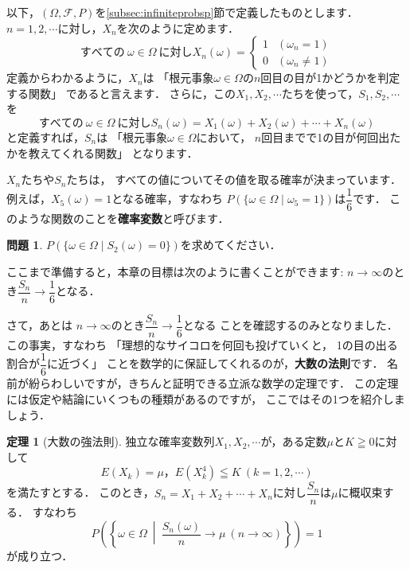 \documentclass[./main]{subfiles} %
\theoremstyle{definition}
\newtheorem{hamadaqst}[hamadadefi]{問題}
\newtheorem{hamadathm}[hamadadefi]{定理}
\begin{document}
\label{randomvariable}

以下，$(\Omega,\mathcal{F},P)$を\ref{subsec:infiniteprobsp}節で定義したものとします．
$n=1,2,\cdots$に対し，$X_n$を次のように定めます．
\[ すべての\ \omega\in\Omega\ に対しX_n(\omega)=
\begin{cases}1 & (\omega_n=1) \\ 0 & (\omega_n\neq1)\end{cases} \]
定義からわかるように，$X_n$は
「根元事象$\omega\in\Omega$の$n$回目の目が1かどうかを判定する関数」
であると言えます．
さらに，この$X_1,X_2,\cdots$たちを使って，$S_1,S_2,\cdots$を
\[ すべての\ \omega\in\Omega\ に対し
S_n(\omega)=X_1(\omega)+X_2(\omega)+\cdots+X_n(\omega) \]
と定義すれば，$S_n$は
「根元事象$\omega\in\Omega$において，
$n$回目までで1の目が何回出たかを教えてくれる関数」
となります．

$X_n$たちや$S_n$たちは，
すべての値についてその値を取る確率が決まっています．
例えば，$X_5(\omega)=1$となる確率，すなわち
$P(\{\omega\in\Omega\mid\omega_5=1\})$は$\dfrac{1}{6}$です．
このような関数のことを\textbf{確率変数}と呼びます．

\begin{hamadaqst}\label{checkofrandomvariable}
$P(\{\omega\in\Omega\mid S_2(\omega)=0\})$を求めてください．
\end{hamadaqst}

ここまで準備すると，本章の目標は次のように書くことができます:
$n\to\infty$のとき$\dfrac{S_n}{n}\to\dfrac{1}{6}$となる．

\label{subsec:LOLN}

さて，あとは
$n\to\infty$のとき$\dfrac{S_n}{n}\to\dfrac{1}{6}$となる
ことを確認するのみとなりました．
この事実，すなわち
「理想的なサイコロを何回も投げていくと，
1の目の出る割合が$\dfrac{1}{6}$に近づく」
ことを数学的に保証してくれるのが，\textbf{大数の法則}です．
名前が紛らわしいですが，きちんと証明できる立派な数学の定理です．
この定理には仮定や結論にいくつもの種類があるのですが，
ここではその1つを紹介しましょう．

\begin{hamadathm}[大数の強法則]\label{stronglawoflargenumber}
独立な確率変数列$X_1,X_2,\cdots$が，ある定数$\mu$と$K\geqq0$に対して
\[ E(X_k)=\mu，E(X_k^4)\leqq K\ (k=1,2,\cdots) \]
を満たすとする．
このとき，$S_n=X_1+X_2+\cdots+X_n$に対し$\dfrac{S_n}{n}$は$\mu$に概収束する．
すなわち
\[ P\left(\left\{\omega\in\Omega\ \middle|
\ \frac{S_n(\omega)}{n}\to\mu\ (n\to\infty)\right\}\right)=1 \]
が成り立つ．
\end{hamadathm}
\end{document}
